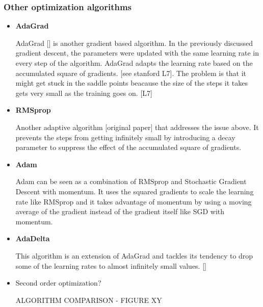 \subsubsection{Other optimization algorithms}
\begin{itemize}
	\item \textbf{AdaGrad}
	
	AdaGrad [] is another gradient based algorithm. In the previously discussed gradient descent, the parameters were updated with the same learning rate in every step of the algorithm. AdaGrad adapts the learning rate based on the accumulated square of gradients. [see stanford L7]. The problem is that it might get stuck in the saddle points beacause the size of the steps it takes gets very small as the training goes on. [L7]
	
	\item \textbf{RMSprop}
	
	Another adaptive algorithm [original paper] that addresses the issue above. It prevents the steps from getting infinitely small by introducing a decay parameter to suppress the effect of the accumulated square of gradients.	
	
	\item \textbf{Adam}
	
	Adam can be seen as a combination of RMSprop and Stochastic Gradient Descent with momentum. It uses the squared gradients to scale the learning rate like RMSprop and it takes advantage of momentum by using a moving average of the gradient instead of the gradient itself like SGD with momentum. %
	
	\item \textbf{AdaDelta}
	
	This algorithm is an extension of AdaGrad and tackles its tendency to drop some of the learning rates to almost infinitely small values. []
	
	\item Second order optimization?
	
	ALGORITHM COMPARISON - FIGURE XY
\end{itemize}

